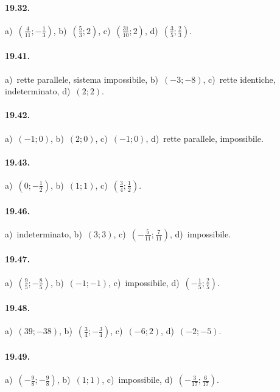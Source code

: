 \paragraph{19.32.} a)~$\left(\frac{4}{11};-\frac{1}{3}\right)$, \quad b)~$\left(\frac{5}{3};2\right)$, \quad c)~$\left(\frac{31}{10};2\right)$, \quad d)~$\left(\frac{3}{5};\frac{2}{3}\right)$.

\paragraph{19.41.} a)~rette parallele, sistema impossibile, \quad b)~$(-3;-8)$, \quad c)~rette identiche, indeterminato, \quad d)~$(2;2)$.

\paragraph{19.42.} a)~$\left(-1;0\right)$, \quad b)~$(2;0)$, \quad c)~$\left(-1;0\right)$, \quad d)~rette parallele, impossibile.

\paragraph{19.43.} a)~$\left(0;-\frac{1}{2}\right)$, \quad b)~$(1;1)$, \quad c)~$\left(\frac{3}{4};\frac{1}{2}\right)$.

\paragraph{19.46.} a)~indeterminato, \quad b)~$(3;3)$, \quad c)~$\left(-\frac{5}{11};\frac{7}{11}\right)$, \quad d)~impossibile.

\paragraph{19.47.} a)~$\left(\frac{9}{5};-\frac{8}{5}\right)$, \quad b)~$(-1;-1)$, \quad c)~impossibile, \quad d)~$\left(-\frac{1}{5};\frac{2}{5}\right)$.

\paragraph{19.48.} a)~$(39;-38)$, \quad b)~$\left(\frac{3}{4};-\frac{3}{4}\right)$, \quad c)~$(-6;2)$, \quad d)~$(-2;-5)$.

\paragraph{19.49.} a)~$\left(-\frac{9}{8};-\frac{9}{8}\right)$, \quad b)~$(1;1)$, \quad c)~impossibile, \quad d)~$\left(-\frac{3}{17};\frac{6}{17}\right)$.

